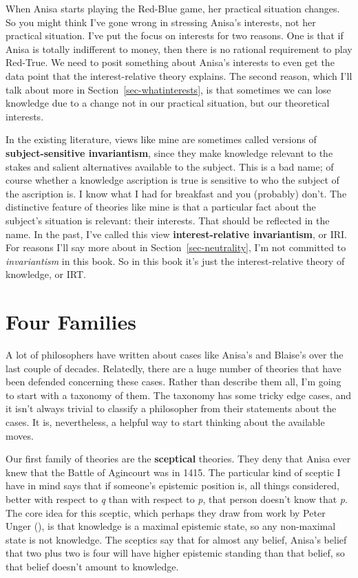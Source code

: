 \documentclass[
  10pt,
  letterpaper,
  twoside]{scrbook}
\begin{document}
When Anisa starts playing the Red-Blue game, her practical situation
changes. So you might think I've gone wrong in stressing Anisa's
interests, not her practical situation. I've put the focus on interests
for two reasons. One is that if Anisa is totally indifferent to money,
then there is no rational requirement to play Red-True. We need to posit
something about Anisa's interests to even get the data point that the
interest-relative theory explains. The second reason, which I'll talk
about more in Section~\ref{sec-whatinterests}, is that sometimes we can
lose knowledge due to a change not in our practical situation, but our
theoretical interests.

In the existing literature, views like mine are sometimes called
versions of \textbf{subject-sensitive invariantism}, since they make
knowledge relevant to the stakes and salient alternatives available to
the subject. This is a bad name; of course whether a knowledge
ascription is true is sensitive to who the subject of the ascription is.
I know what I had for breakfast and you (probably) don't. The
distinctive feature of theories like mine is that a particular fact
about the subject's situation is relevant: their interests. That should
be reflected in the name. In the past, I've called this view
\textbf{interest-relative invariantism}, or IRI. For reasons I'll say
more about in Section~\ref{sec-neutrality}, I'm not committed to
\emph{invariantism} in this book. So in this book it's just the
interest-relative theory of knowledge, or IRT.

\section{Four Families}\label{sec-fourfamilies}

A lot of philosophers have written about cases like Anisa's and Blaise's
over the last couple of decades. Relatedly, there are a huge number of
theories that have been defended concerning these cases. Rather than
describe them all, I'm going to start with a taxonomy of them. The
taxonomy has some tricky edge cases, and it isn't always trivial to
classify a philosopher from their statements about the cases. It is,
nevertheless, a helpful way to start thinking about the available moves.

Our first family of theories are the \textbf{sceptical} theories. They
deny that Anisa ever knew that the Battle of Agincourt was in 1415. The
particular kind of sceptic I have in mind says that if someone's
epistemic position is, all things considered, better with respect to
\emph{q} than with respect to \emph{p}, that person doesn't know that
\emph{p}. The core idea for this sceptic, which perhaps they draw from
work by Peter Unger (), is that knowledge
is a maximal epistemic state, so any non-maximal state is not knowledge.
The sceptics say that for almost any belief, Anisa's belief that two
plus two is four will have higher epistemic standing than that belief,
so that belief doesn't amount to knowledge.
\end{document}
